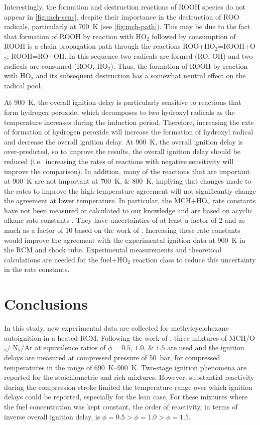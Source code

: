 \documentclass[../main.tex]{subfiles}
\begin{document}
Interestingly, the formation and destruction reactions of ROOH species
do not appear in \cref{fig:mch-sens}, despite their importance in
the destruction of ROO radicals, particularly at \SI{700}{\kelvin}
(see \cref{fig:mch-path}). This may be due to the fact that
formation of ROOH by reaction with HO$_2$ followed by consumption of ROOH
is a chain propagation path through the reactions ROO+HO$_2$=ROOH+O$_2$;
ROOH=RO+OH. In this sequence two radicals are formed (RO, OH) and two
radicals are consumed (ROO, HO$_2$). Thus, the formation of ROOH by
reaction with HO$_2$ and its subsequent destruction has a somewhat
neutral effect on the radical pool.

At \SI{900}{\kelvin}, the overall ignition delay is particularly sensitive
to reactions that form hydrogen peroxide, which decomposes to two
hydroxyl radicals as the temperature increases during the induction
period. Therefore, increasing the rate of formation of hydrogen peroxide
will increase the formation of hydroxyl radical and decrease the overall
ignition delay. At \SI{900}{\kelvin}, the overall ignition delay is
over-predicted, so to improve the results, the overall ignition delay
should be reduced (i.e.\ increasing the rates of reactions with negative
sensitivity will improve the comparison). In addition, many of the
reactions that are important at \SI{900}{\kelvin} are not important at
\SIlist{700;800}{\kelvin}, implying that changes made to the rates to
improve the high-temperature agreement will not significantly change the
agreement at lower temperature. In particular, the MCH+HO$_2$ rate constants
have not been measured or calculated to our knowledge and are based
on acyclic alkane rate constants \cite{Aguilera-Iparraguirre2008}. They have uncertainties of at
least a factor of 2 and as much as a factor of 10 based on the work
of \textcite{Aguilera-Iparraguirre2008}. Increasing these rate constants
would improve the agreement with the experimental ignition data at
\SI{900}{\kelvin} in the RCM and shock tube. Experimental measurements
and theoretical calculations are needed for the fuel+HO$_2$ reaction class to
reduce this uncertainty in the rate constants.

\section{Conclusions}

In this study, new experimental data are collected for methylcyclohexane
autoignition in a heated RCM. Following the work
of \textcite{Mittal2009}, three mixtures of MCH/O$_2$/ N$_2$/Ar at equivalence
ratios of $\phi=\numlist{0.5;1.0;1.5}$ are used and the ignition delays
are measured at compressed pressure of \SI{50}{\bar}, for compressed
temperatures in the range of \SIrange{690}{900}{\kelvin}. Two-stage
ignition phenomena are reported for the stoichiometric and rich
mixtures. However, substantial reactivity during the compression
stroke limited the temperature range over which ignition delays could
be reported, especially for the lean case. For these mixtures where the
fuel concentration was kept constant, the order of reactivity, in terms
of inverse overall ignition delay, is $\phi=\num{0.5}>\phi=\num{1.0}>\phi=\num{1.5}$.
\end{document}
